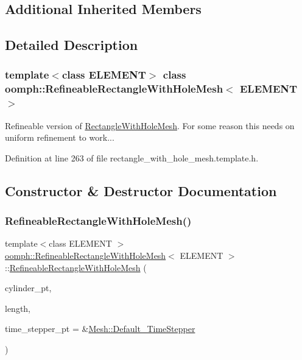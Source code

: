 \subsection*{Additional Inherited Members}


\subsection{Detailed Description}
\subsubsection*{template$<$class E\+L\+E\+M\+E\+NT$>$\newline
class oomph\+::\+Refineable\+Rectangle\+With\+Hole\+Mesh$<$ E\+L\+E\+M\+E\+N\+T $>$}

Refineable version of \hyperlink{classoomph_1_1RectangleWithHoleMesh}{Rectangle\+With\+Hole\+Mesh}. For some reason this needs on uniform refinement to work... 

Definition at line 263 of file rectangle\+\_\+with\+\_\+hole\+\_\+mesh.\+template.\+h.



\subsection{Constructor \& Destructor Documentation}
\mbox{\label{classoomph_1_1RefineableRectangleWithHoleMesh_a1b403fb6e31836c816e9a9cdfaa7703b}} 
\subsubsection{\texorpdfstring{Refineable\+Rectangle\+With\+Hole\+Mesh()}{RefineableRectangleWithHoleMesh()}}
{\footnotesize\ttfamily template$<$class E\+L\+E\+M\+E\+NT $>$ \\
\hyperlink{classoomph_1_1RefineableRectangleWithHoleMesh}{oomph\+::\+Refineable\+Rectangle\+With\+Hole\+Mesh}$<$ E\+L\+E\+M\+E\+NT $>$\+::\hyperlink{classoomph_1_1RefineableRectangleWithHoleMesh}{Refineable\+Rectangle\+With\+Hole\+Mesh} (\begin{DoxyParamCaption}\item[{\hyperlink{classoomph_1_1GeomObject}{Geom\+Object} $\ast$}]{cylinder\+\_\+pt,  }\item[{const double \&}]{length,  }\item[{\hyperlink{classoomph_1_1TimeStepper}{Time\+Stepper} $\ast$}]{time\+\_\+stepper\+\_\+pt = {\ttfamily \&\hyperlink{classoomph_1_1Mesh_a12243d0fee2b1fcee729ee5a4777ea10}{Mesh\+::\+Default\+\_\+\+Time\+Stepper}} }\end{DoxyParamCaption})\hspace{0.3cm}{\ttfamily [inline]}}



